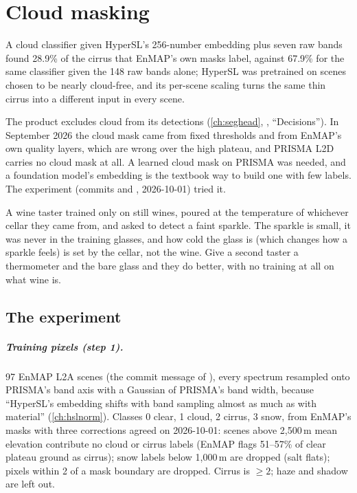 \chapter{Cloud masking}\label{ch:hslcloud}
\def\tbrk{\hfil\penalty50\hfilneg}%

\begin{onething}
A cloud classifier given HyperSL's 256-number embedding plus seven raw bands found 28.9\% of the cirrus that EnMAP's own
masks label, against 67.9\% for the same classifier given the 148 raw bands alone; HyperSL was pretrained on scenes chosen
to be nearly cloud-free, and its per-scene scaling turns the same thin cirrus into a different input in every scene.
\end{onething}

The product excludes cloud from its detections (\cref{ch:seghead}, , ``Decisions''). In
September 2026 the cloud mask came from fixed thresholds and from EnMAP's own quality layers, which are wrong over the
high plateau, and PRISMA L2D carries no cloud mask at all. A learned cloud mask on PRISMA was needed, and a foundation
model's embedding is the textbook way to build one with few labels. The experiment
 (commits  and , 2026-10-01) tried it.

\begin{analogy}
A wine taster trained only on still wines, poured at the temperature of whichever cellar they came from, and asked to
detect a faint sparkle. The sparkle is small, it was never in the training glasses, and how cold the glass is (which
changes how a sparkle feels) is set by the cellar, not the wine. Give a second taster a thermometer and the bare glass
and they do better, with no training at all on what wine is.
\end{analogy}

\section{The experiment}\label{sec:hslcloud:setup}

\paragraph{Training pixels (step 1).} 97 EnMAP L2A scenes (the commit message of ), every spectrum
resampled onto PRISMA's band axis with a Gaussian of PRISMA's band width, because ``HyperSL's embedding shifts with band
sampling almost as much as with material'' (\cref{ch:hslnorm}). Classes 0 clear, 1 cloud, 2 cirrus, 3 snow, from EnMAP's
 masks with three corrections agreed on 2026-10-01: scenes above 2,500\,m mean elevation contribute no
cloud or cirrus labels (EnMAP flags 51--57\% of clear plateau ground as cirrus); snow labels below 1,000\,m are dropped
(salt flats); pixels within 2 of a mask boundary are dropped. Cirrus is  $\ge2$; haze and shadow
are left out\tbrk{}.


